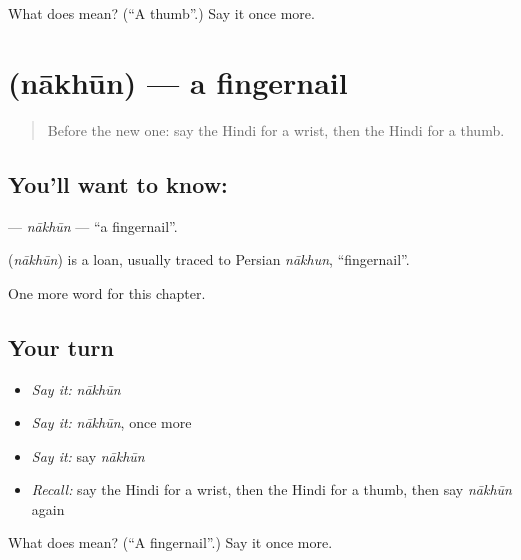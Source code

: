 \begin{tcolorbox}[breakable,colback=teal!4,colframe=teal!35!black,title={Before you move on}]
What does  mean? (\textquotedblleft{}A thumb\textquotedblright{}.) Say it once more.
\end{tcolorbox}
\section[\texorpdfstring{\hi{नाखून} (nākhūn)}{नाखून (nākhūn)}]{ (nākhūn) — a fingernail}

\label{lesson:HI-C150-nakhun}



\begin{quote}
Before the new one: say the Hindi for a wrist, then the Hindi for a thumb.
\end{quote}

\subsection*{You'll want to know: }
\textbf{} — \emph{nākhūn} — \textquotedblleft{}a fingernail\textquotedblright{}.

\begin{cousinweb}
\textbf{} (\emph{nākhūn}) is a loan, usually traced to Persian \emph{nākhun}, \textquotedblleft{}fingernail\textquotedblright{}.
\end{cousinweb}

\begin{grammarlens}[title={What you've built}]
One more word for this chapter.
\end{grammarlens}

\subsection*{Your turn}
\begin{itemize}
\raggedright
  \item \emph{Say it:} \emph{nākhūn}
  \item \emph{Say it:} \emph{nākhūn}, once more
  \item \emph{Say it:} say \emph{nākhūn}
  \item \emph{Recall:} say the Hindi for a wrist, then the Hindi for a thumb, then say \emph{nākhūn} again
\end{itemize}

\begin{tcolorbox}[breakable,colback=teal!4,colframe=teal!35!black,title={Before you move on}]
What does  mean? (\textquotedblleft{}A fingernail\textquotedblright{}.) Say it once more.
\end{tcolorbox}

